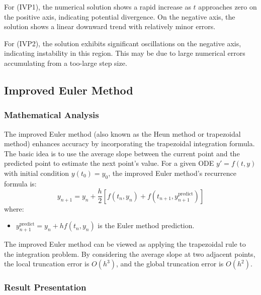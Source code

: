\documentclass{article}
\begin{document}
For (IVP1), the numerical solution shows a rapid increase as \( t \) approaches zero on the positive axis, indicating potential divergence. On the negative axis, the solution shows a linear downward trend with relatively minor errors.

For (IVP2), the solution exhibits significant oscillations on the negative axis, indicating instability in this region. This may be due to large numerical errors accumulating from a too-large step size.

\subsection{Improved Euler Method}

\subsubsection{Mathematical Analysis}
The improved Euler method (also known as the Heun method or trapezoidal method) enhances accuracy by incorporating the trapezoidal integration formula. The basic idea is to use the average slope between the current point and the predicted point to estimate the next point's value. For a given ODE \( y' = f(t, y) \) with initial condition \( y(t_0) = y_0 \), the improved Euler method's recurrence formula is:
\[
y_{n+1} = y_n + \frac{h}{2} \left[ f(t_n, y_n) + f(t_{n+1}, y_{n+1}^{\text{predict}}) \right]
\]
where:
\begin{itemize}
    \item \( y_{n+1}^{\text{predict}} = y_n + h f(t_n, y_n) \) is the Euler method prediction.
\end{itemize}

The improved Euler method can be viewed as applying the trapezoidal rule to the integration problem. By considering the average slope at two adjacent points, the local truncation error is \( O(h^3) \), and the global truncation error is \( O(h^2) \).

\subsubsection{Result Presentation}
\end{document}
